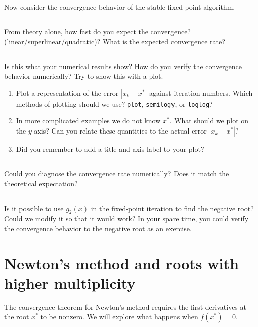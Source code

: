 \documentclass[11pt,letterpaper]{article}
\begin{document}
Now consider the convergence behavior of the stable fixed point algorithm. 

\subsection{}
From theory alone, how fast do you expect the convergence? (linear/superlinear/quadratic)? What is the expected convergence rate?

\subsection{}
Is this what your numerical results show? How do you verify the convergence behavior numerically? Try to show this with a plot. 
\begin{enumerate}
    \item Plot a representation of the error $|x_k-x^*|$ against iteration numbers. Which methods of plotting should we use? \texttt{plot}, \texttt{semilogy}, or \texttt{loglog}?
    \item In more complicated examples we do not know $x^*$. What should we plot on the $y$-axis? Can you relate these quantities to the actual error $|x_k-x^*|$?
    \item Did you remember to add a title and axis label to your plot?
\end{enumerate}

\subsection{}
Could you diagnose the convergence rate numerically? Does it match the theoretical expectation?

\subsection{}
Is it possible to use $g_2(x)$ in the fixed-point iteration to find the negative root? Could we modify it so that it would work? In your spare time, you could verify the convergence behavior to the negative root as an exercise. 

\newpage
\section{Newton's method and roots with higher multiplicity}
The convergence theorem for Newton's method requires the first derivatives at the root $x^*$ to be nonzero. We will explore what happens when $f(x^*) = 0$.
\end{document}
